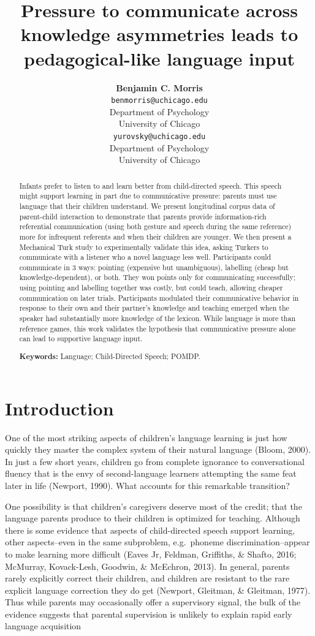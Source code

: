 \documentclass[10pt, letterpaper]{article}
\title{Pressure to communicate across knowledge asymmetries leads to
pedagogical-like language input}
\author{{\large \bf Benjamin C. Morris} \\ \texttt{benmorris@uchicago.edu} \\ Department of Psychology \\ University of Chicago \And {\large \bf Daniel Yurovsky} \\ \texttt{yurovsky@uchicago.edu} \\ Department of Psychology \\ University of Chicago}
\begin{document}
\maketitle

\begin{abstract}
Infants prefer to listen to and learn better from child-directed speech.
This speech might support learning in part due to communicative
pressure: parents must use language that their children understand. We
present longitudinal corpus data of parent-child interaction to
demonstrate that parents provide information-rich referential
communication (using both gesture and speech during the same reference)
more for infrequent referents and when their children are younger. We
then present a Mechanical Turk study to experimentally validate this
idea, asking Turkers to communicate with a listener who a novel language
less well. Participants could communicate in 3 ways: pointing (expensive
but unambiguous), labelling (cheap but knowledge-dependent), or both.
They won points only for communicating successfully; using pointing and
labelling together was costly, but could teach, allowing cheaper
communication on later trials. Participants modulated their
communicative behavior in response to their own and their partner's
knowledge and teaching emerged when the speaker had substantially more
knowledge of the lexicon. While language is more than reference games,
this work validates the hypothesis that communicative pressure alone can
lead to supportive language input.

\textbf{Keywords:}
Language; Child-Directed Speech; POMDP.
\end{abstract}

\section{Introduction}\label{introduction}

One of the most striking aspects of children's language learning is just
how quickly they master the complex system of their natural language
(Bloom, 2000). In just a few short years, children go from complete
ignorance to conversational fluency that is the envy of second-language
learners attempting the same feat later in life (Newport, 1990). What
accounts for this remarkable transition?

One possibility is that children's caregivers deserve most of the
credit; that the language parents produce to their children is optimized
for teaching. Although there is some evidence that aspects of
child-directed speech support learning, other aspects--even in the same
subproblem, e.g.~phoneme discrimination--appear to make learning more
difficult (Eaves Jr, Feldman, Griffiths, \& Shafto, 2016; McMurray,
Kovack-Lesh, Goodwin, \& McEchron, 2013). In general, parents rarely
explicitly correct their children, and children are resistant to the
rare explicit language correction they do get (Newport, Gleitman, \&
Gleitman, 1977). Thus while parents may occasionally offer a supervisory
signal, the bulk of the evidence suggests that parental supervision is
unlikely to explain rapid early language acquisition
\end{document}
